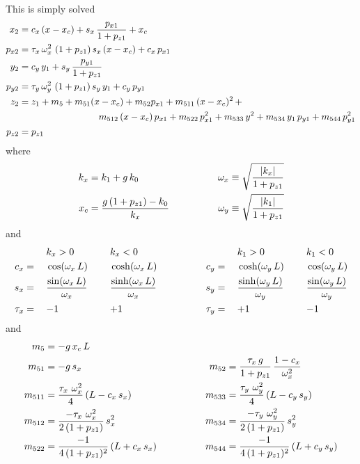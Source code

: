 This is simply solved
\begin{align}
  x_2    &= c_x \, (x - x_c) + s_x \, \frac{p_{x1}}{1 + p_{z1}} + x_c \CRNO
  p_{x2} &= \tau_x \, \om_x^2 \, \, (1 + p_{z1}) \, s_x \, (x -x_c) + c_x \, p_{x1} \CRNO
  y_2    &= c_y \, y_1 + s_y \, \frac{p_{y1}}{1 + p_{z1}} \CRNO
  p_{y2} &= \tau_y \, \om_y^2 \, \, (1 + p_{z1}) \, s_y \, y_1 + c_y \, p_{y1} \\
  z_2    &= z_1 + m_5 + m_{51} (x - x_c) + m_{52} p_{x1} + m_{511} \, (x-x_c)^2 \, + \CRNO
         &\hspace*{20ex} m_{512} \, (x-x_c) \, p_{x1} + m_{522} \, p_{x1}^2 + 
                         m_{533} \, y^2 + m_{534} \, y_1 \, p_{y1} + m_{544} \, p_{y1}^2 \CRNO
  p_{z2} &= p_{z1} \nonumber
\end{align}
where 
\begin{alignat}{2}
  k_x &= k_1 + g \, k_0 & \qquad \qquad
  \omega_x &\equiv \sqrt{\frac{|k_x|}{1 + p_{z1}}} \nonumber \\
  x_c &= \frac{g \, (1 + p_{z1}) - k_0}{k_x} & \qquad \qquad
  \omega_y &\equiv \sqrt{\frac{|k_1|}{1 + p_{z1}}} 
\end{alignat}
and
\begin{alignat}{6}
         &\hspace*{3ex}  && k_x > 0          &\hspace*{3ex}& k_x < 0 & \qquad \qquad
         &\hspace*{3ex}  && k_1 > 0          &\hspace*{3ex}& k_1 < 0 \nonumber \\
     c_x &=   && \cos  (\omega_x \, L)               && \cosh (\omega_x \, L) & \qquad \qquad
     c_y &=   && \cosh (\omega_y \, L)               && \cos  (\omega_y \, L) \nonumber \\
     s_x &=   && \frac{\sin  (\omega_x \, L)}{\omega_x} && \frac{\sinh (\omega_x \, L)}{\omega_x} & \qquad \qquad
     s_y &=   && \frac{\sinh (\omega_y \, L)}{\omega_y} && \frac{\sin  (\omega_y \, L)}{\omega_y} \\
  \tau_x &=   && {-}1             && {+}1             & \qquad \qquad
  \tau_y &=   && {+}1             && {-}1             \nonumber
\end{alignat}
and
\begin{alignat}{2}
  m_5     &= -g \, x_c \, L & \qquad \qquad & \nonumber \\
  m_{51}  &= -g \, s_x & \qquad \qquad
  m_{52}  &= \frac{\tau_x \, g}{1 + p_{z1}} \, \frac{1 - c_x}{\omega_x^2} \nonumber \\
  m_{511} &= \frac{\tau_x \,\, \omega_x^2}{4} \, (L - c_x \, s_x) & \qquad \qquad
  m_{533} &= \frac{\tau_y \,\, \omega_y^2}{4} \, (L - c_y \, s_y) \nonumber \\
  m_{512} &= \frac{-\tau_x \,\, \omega_x^2}{2 \, (1 + p_{z1})} \, s_x^2 & \qquad \qquad
  m_{534} &= \frac{-\tau_y \,\, \omega_y^2}{2 \, (1 + p_{z1})} \, s_y^2 \nonumber \\
  m_{522} &= \frac{-1}{4 \, (1 + p_{z1})^2} \, (L + c_x \, s_x) & \qquad \qquad
  m_{544} &= \frac{-1}{4 \, (1 + p_{z1})^2} \, (L + c_y \, s_y) \nonumber
\end{alignat}

